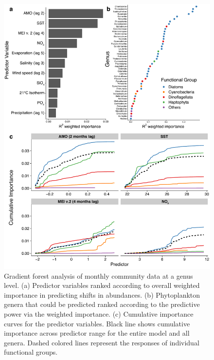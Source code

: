 \documentclass[draft]{agujournal2019}
\begin{document}
    \begin{figure}
    \noindent\includegraphics[width=\textwidth]{fig/Figure6_GF_output_FINAL_v2.pdf}
    \caption{Gradient forest analysis of monthly community data at a genus level. (a) Predictor variables ranked according to overall weighted importance in predicting shifts in abundances. (b) Phytoplankton genera that could be predicted ranked according to the predictive power via the weighted importance. (c) Cumulative importance curves for the predictor variables. Black line shows cumulative importance across predictor range for the entire model and all genera. Dashed colored lines represent the responses of individual functional groups.}
    \label{fig:GF}
    \end{figure}
    
\end{document}
